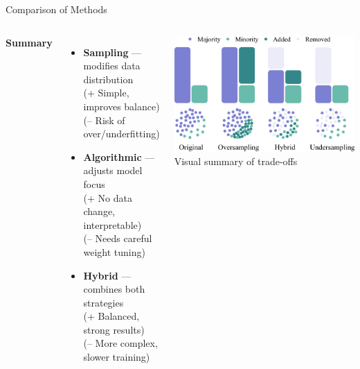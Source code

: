 \documentclass[serif, aspectratio=169]{beamer}
\begin{document}
    \begin{frame}{Comparison of Methods}

        \begin{columns}[c,onlytextwidth]
            \textbf{Summary}

            \begin{itemize}\itemsep0.6em
            \item \textbf{Sampling} — modifies data distribution\\
            \textcolor{green!60!black}{\small(+ Simple, improves balance)}\\
            \textcolor{red!70!black}{\small(– Risk of over/underfitting)}

            \item \textbf{Algorithmic} — adjusts model focus  \\
            \textcolor{green!60!black}{\small(+ No data change, interpretable)}\\
            \textcolor{red!70!black}{\small(– Needs careful weight tuning)}

            \item \textbf{Hybrid} — combines both strategies  \\
            \textcolor{green!60!black}{\small(+ Balanced, strong results)}  \\
            \textcolor{red!70!black}{\small(– More complex, slower training)}
            \end{itemize}

            \centering
            \includegraphics[width=0.9\linewidth]{pic/Figure_35.png}\\
            \scriptsize Visual summary of trade-offs
        \end{columns}

    \end{frame}
\end{document}

